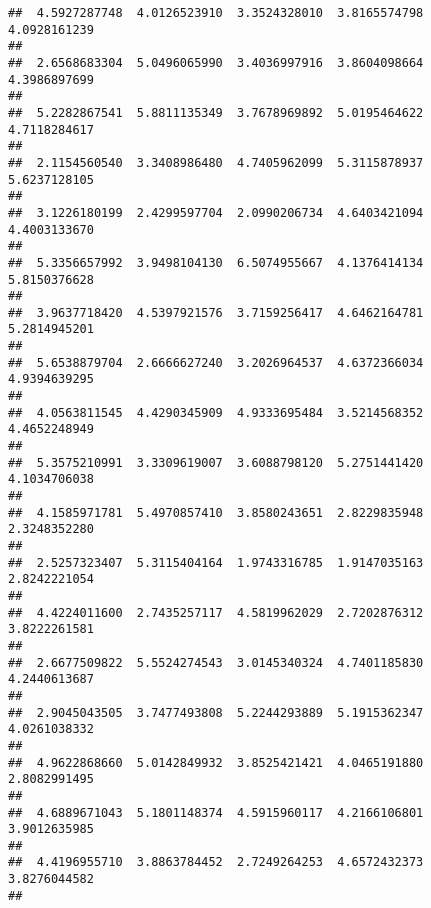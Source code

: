 \documentclass[]{article}
\begin{document}
\begin{verbatim}
##  4.5927287748  4.0126523910  3.3524328010  3.8165574798  4.0928161239 
##                                                                       
##  2.6568683304  5.0496065990  3.4036997916  3.8604098664  4.3986897699 
##                                                                       
##  5.2282867541  5.8811135349  3.7678969892  5.0195464622  4.7118284617 
##                                                                       
##  2.1154560540  3.3408986480  4.7405962099  5.3115878937  5.6237128105 
##                                                                       
##  3.1226180199  2.4299597704  2.0990206734  4.6403421094  4.4003133670 
##                                                                       
##  5.3356657992  3.9498104130  6.5074955667  4.1376414134  5.8150376628 
##                                                                       
##  3.9637718420  4.5397921576  3.7159256417  4.6462164781  5.2814945201 
##                                                                       
##  5.6538879704  2.6666627240  3.2026964537  4.6372366034  4.9394639295 
##                                                                       
##  4.0563811545  4.4290345909  4.9333695484  3.5214568352  4.4652248949 
##                                                                       
##  5.3575210991  3.3309619007  3.6088798120  5.2751441420  4.1034706038 
##                                                                       
##  4.1585971781  5.4970857410  3.8580243651  2.8229835948  2.3248352280 
##                                                                       
##  2.5257323407  5.3115404164  1.9743316785  1.9147035163  2.8242221054 
##                                                                       
##  4.4224011600  2.7435257117  4.5819962029  2.7202876312  3.8222261581 
##                                                                       
##  2.6677509822  5.5524274543  3.0145340324  4.7401185830  4.2440613687 
##                                                                       
##  2.9045043505  3.7477493808  5.2244293889  5.1915362347  4.0261038332 
##                                                                       
##  4.9622868660  5.0142849932  3.8525421421  4.0465191880  2.8082991495 
##                                                                       
##  4.6889671043  5.1801148374  4.5915960117  4.2166106801  3.9012635985 
##                                                                       
##  4.4196955710  3.8863784452  2.7249264253  4.6572432373  3.8276044582 
##                                                                       

\end{verbatim}
\end{document}
